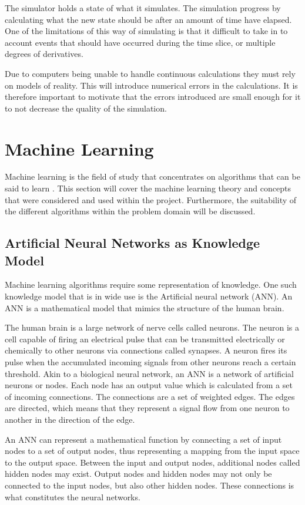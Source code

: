 The simulator holds a state of what it simulates. The simulation progress by calculating what the new state should be after an amount of time have elapsed. One of the limitations of this way of simulating is that it difficult to take in to account events that should have occurred during the time slice, or multiple degrees of derivatives. 

Due to computers being unable to handle continuous calculations they must rely on models of reality. This will introduce numerical errors in the calculations. It is therefore important to motivate that the errors introduced are small enough for it to not decrease the quality of the simulation.



\section{Machine Learning}
Machine learning is the field of study that concentrates on algorithms that can be said to learn \cite{glossary}. This section will cover the machine learning theory and concepts that were considered and used within the project. Furthermore, the suitability of the different algorithms within the problem domain will be discussed.  

\subsection{Artificial Neural Networks as Knowledge Model}
Machine learning algorithms require some representation of knowledge. One such knowledge model that is in wide use is the Artificial neural network (ANN). An ANN is a mathematical model that mimics the structure of the human brain. 

The human brain is a large network of nerve cells called neurons. The neuron is a cell capable of firing an electrical pulse that can be transmitted electrically or chemically to other neurons via connections called synapses. A neuron fires its pulse when the accumulated incoming signals from other neurons reach a certain threshold. Akin to a biological neural network, an ANN is a network of artificial neurons or nodes. Each node has an output value which is calculated from a set of incoming connections. The connections are a set of weighted edges. The edges are directed, which means that they represent a signal flow from one neuron to another in the direction of the edge.

An ANN can represent a mathematical function by connecting a set of input nodes to a set of output nodes, thus representing a mapping from the input space to the output space. Between the input and output nodes, additional nodes called hidden nodes may exist. Output nodes and hidden nodes may not only be connected to the input nodes, but also other hidden nodes. These connections is what constitutes the neural networks. 

